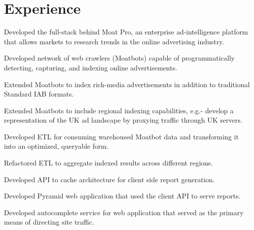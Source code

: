 \documentclass[]{deedy-resume-openfont}
\begin{document}
\hfill
\begin{minipage}[t]{0.66\textwidth} 

    \section{Experience}

        \vspace{\topsep} %
        \begin{tightemize}
            \item
                Developed the full-stack behind Moat Pro, an enterprise
                ad-intelligence platform that allows markets to research trends
                in the online advertising industry.
            \item
                Developed network of web crawlers (Moatbots) capable of
                programmatically detecting, capturing, and indexing online
                advertisements.
            \item
                Extended Moatbots to index rich-media advertisements in
                addition to traditional Standard IAB formats.
            \item
                Extended Moatbots to include regional indexing capabilities,
                e.g.- develop a representation of the UK ad landscape by
                proxying traffic through UK servers.
            \item
                Developed ETL for consuming warehoused Moatbot data and
                transforming it into an optimized, queryable form.
            \item
                Refactored ETL to aggregate indexed results across different
                regions.
            \item
                Developed API to cache architecture for client side report
                generation.
            \item
                Developed Pyramid web application that used the client API to
                serve reports.
            \item
                Developed autocomplete service for web application that served
                as the primary means of directing site traffic.
            \item

\end{tightemize}
\end{minipage}
\end{document}
